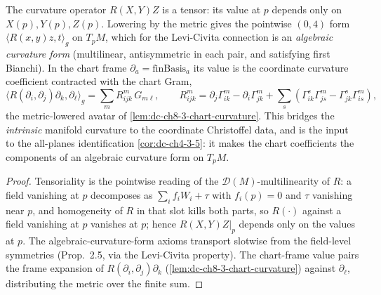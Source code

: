 \begin{lemma}
  \label{lem:dc-ch8-3-pointwise-curvature-form}
  \leanok
  The curvature operator $R(X,Y)Z$ is a tensor: its value at $p$ depends only on
  $X(p),Y(p),Z(p)$. Lowering by the
  metric gives the pointwise $(0,4)$ form $\langle R(x,y)z,t\rangle_g$ on
  $T_pM$, which for the Levi-Civita connection is an \emph{algebraic curvature
  form} (multilinear, antisymmetric in each pair, and satisfying first Bianchi).
  In the chart frame $\partial_a=\text{finBasis}_a$ its value is the
  coordinate curvature coefficient contracted with the chart Gram,
  $$\langle R(\partial_i,\partial_j)\partial_k,\partial_\ell\rangle_g
    = \sum_m R^m_{ijk}\,G_{m\ell},\qquad
    R^m_{ijk}=\partial_j\Gamma^m_{ik}-\partial_i\Gamma^m_{jk}
      +\sum_s(\Gamma^s_{ik}\Gamma^m_{js}-\Gamma^s_{jk}\Gamma^m_{is}),$$
  the metric-lowered avatar of \cref{lem:dc-ch8-3-chart-curvature}. This bridges
  the \emph{intrinsic} manifold curvature to the coordinate Christoffel data, and
  is the input to the all-planes identification \cref{cor:dc-ch4-3-5}: it makes the
  chart coefficients the components of an algebraic curvature form on $T_pM$.
\end{lemma}
\begin{proof}
  \leanok
\sketch
  Tensoriality is the pointwise reading of the $\mathcal D(M)$-multilinearity of
  $R$: a field vanishing at $p$ decomposes as $\sum_i f_i W_i+\tau$ with
  $f_i(p)=0$ and $\tau$ vanishing near $p$, and homogeneity of $R$ in that slot
  kills both parts, so $R(\cdot)$ against a field vanishing at $p$ vanishes at
  $p$; hence $R(X,Y)Z|_p$ depends only on the values at $p$. The
  algebraic-curvature-form axioms transport slotwise from the field-level
  symmetries (Prop.~2.5, via the Levi-Civita property). The chart-frame value
  pairs the frame expansion of $R(\partial_i,\partial_j)\partial_k$
  (\cref{lem:dc-ch8-3-chart-curvature}) against $\partial_\ell$, distributing the
  metric over the finite sum.
\end{proof}

